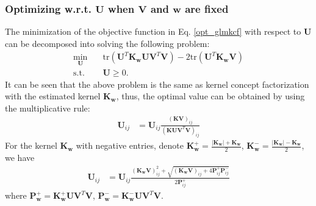 \documentclass[10pt,journal,compsoc]{IEEEtran}
\newcommand{\st}{\mathrm{s.t.}}
\newcommand{\tr}{\mathrm{tr}}
\begin{document}
\subsubsection{Optimizing w.r.t. $\mathbf{U}$ when $\mathbf{V}$ and $\mathbf{w}$ are fixed}
The minimization of the objective function in Eq. \eqref{opt_glmkcf} with respect to $\mathbf{U}$ can be decomposed into solving the following problem:
\begin{align}
\min_{\mathbf{U}} \quad & \tr(\mathbf{U}^T \mathbf{K}_{\mathbf{w}} \mathbf{U} \mathbf{V}^T \mathbf{V}) - 2 \tr(\mathbf{U}^T \mathbf{K}_{\mathbf{w}} \mathbf{V}) \\
\st \quad & \mathbf{U} \geq 0. \nonumber
\end{align}
It can be seen that the above problem is the same as kernel concept factorization with the estimated kernel $\mathbf{K}_{\mathbf{w}}$, thus, the optimal value can be obtained by using the multiplicative rule:
\begin{align} \label{update_g_u_nn}
\mathbf{U}_{ij} & = \mathbf{U}_{ij} \frac{(\mathbf{K} \mathbf{V})_{ij}}{(\mathbf{K} \mathbf{U} \mathbf{V}^{T} \mathbf{V})_{ij}} 
\end{align}
For the kernel $\mathbf{K}_{\mathbf{w}}$ with negative entries, denote $\mathbf{K}_{\mathbf{w}}^{+} = \frac{|\mathbf{K}_{\mathbf{w}}| + \mathbf{K}_{\mathbf{w}}}{2}$, $\mathbf{K}_{\mathbf{w}}^{-} = \frac{|\mathbf{K}_{\mathbf{w}}| - \mathbf{K}_{\mathbf{w}}}{2}$, we have
\begin{align}\label{update_g_u}
\mathbf{U}_{ij} & = \mathbf{U}_{ij} \frac{(\mathbf{K}_{\mathbf{w}} \mathbf{V})_{ij}^2 + \sqrt{(\mathbf{K}_{\mathbf{w}} \mathbf{V})_{ij} + 4 \mathbf{P}_{ij}^{+} \mathbf{P}_{ij}^{-} }}{2 \mathbf{P}_{ij}^{+}} 
\end{align}
where $\mathbf{P}_{\mathbf{w}}^{+} = \mathbf{K}_{\mathbf{w}}^{+} \mathbf{U} \mathbf{V}^{T} \mathbf{V}$, $\mathbf{P}_{\mathbf{w}}^{-} = \mathbf{K}_{\mathbf{w}}^{-} \mathbf{U} \mathbf{V}^{T} \mathbf{V}$.
\end{document}
